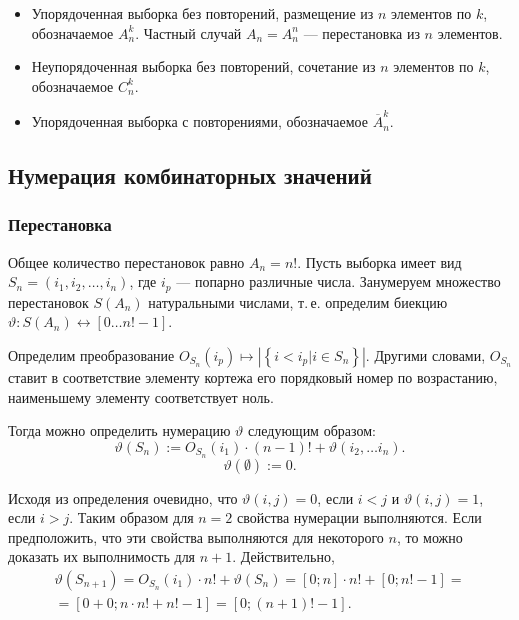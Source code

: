 \documentclass[12pt,a4paper,oneside]{article}
\begin{document}
\begin{itemize}
\item Упорядоченная выборка без повторений, размещение из $n$ элементов по $k$, обозначаемое $A^k_n$. Частный случай $A_n=A^n_n$ --- перестановка из $n$ элементов.
\item Неупорядоченная выборка без повторений, сочетание из $n$ элементов по $k$, обозначаемое $C^k_n$.
\item Упорядоченная выборка с повторениями, обозначаемое $\overline{A}^k_n$.
\end{itemize}

\subsection{Нумерация комбинаторных значений}

\subsubsection{Перестановка}
Общее количество перестановок равно $A_n=n!$.
Пусть выборка имеет вид $S_n=\left(i_1,i_2,\ldots,i_n\right)$, где $i_p$ --- попарно различные числа. Занумеруем множество перестановок $S(A_n)$ натуральными числами, т.\,е. определим биекцию $\vartheta: S(A_n)\leftrightarrow\left[0\ldots n!-1\right]$.

Определим преобразование $O_{S_n}(i_p)\mapsto \left| \left\{i < i_p | i \in S_n \right\} \right|$. Другими словами, $O_{S_n}$ ставит в соответствие элементу кортежа его порядковый номер по возрастанию, наименьшему элементу соответствует ноль.

Тогда можно определить нумерацию $\vartheta$ следующим образом:
$$
\vartheta(S_n) := O_{S_n}(i_1)\cdot(n-1)! + \vartheta(i_2,\ldots i_{n}).
$$
$$
\vartheta(\emptyset) := 0.
$$

Исходя из определения очевидно, что $\vartheta(i,j)=0$, если $i<j$ и $\vartheta(i,j)=1$, если $i>j$. Таким образом для $n=2$ свойства нумерации выполняются. Если предположить, что эти свойства выполняются для некоторого $n$, то можно доказать их выполнимость для $n+1$. Действительно, 
\begin{eqnarray*}
\vartheta(S_{n+1}) = O_{S_n}(i_1)\cdot n! + \vartheta(S_{n}) 
= \left[0;n\right]\cdot n! + \left[0;n!-1\right] =\\
= \left[0+0;n\cdot n! + n! - 1\right] 
= \left[0;(n+1)!-1\right].
\end{eqnarray*}
\end{document}
